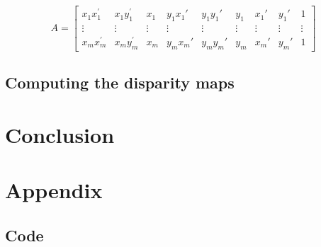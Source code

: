 \documentclass[letterpaper,11pt]{article}
\begin{document}
\[
A = \begin{bmatrix} x_{1}x_{1}^{'} & x_{1}y_{1}^{'} & x_{1} & y_{1}x_{1}' & y_{1}y_{1}' & y_{1} & x_{1}' & y_{1}'& 1  \\ \vdots & \vdots & \vdots &\vdots &\vdots & \vdots & \vdots & \vdots &\vdots\\ x_{m}x_{m}^{'} & x_{m}y_{m}^{'} & x_{m} & y_{m}x_{m}' & y_{m}y_{m}' & y_{m} & x_{m}' & y_{m}'& 1 \end{bmatrix}
\]


\subsection{Computing the disparity maps}


\section{Conclusion}


\section{Appendix}

\subsection{Code}
\end{document}
